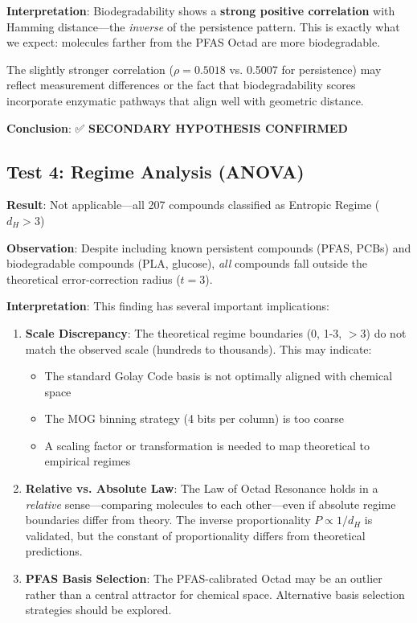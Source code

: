\documentclass[11pt,letterpaper]{article}
\begin{document}
\textbf{Interpretation}: Biodegradability shows a \textbf{strong positive correlation} with Hamming distance—the \textit{inverse} of the persistence pattern. This is exactly what we expect: molecules farther from the PFAS Octad are more biodegradable.

The slightly stronger correlation ($\rho = 0.5018$ vs. 0.5007 for persistence) may reflect measurement differences or the fact that biodegradability scores incorporate enzymatic pathways that align well with geometric distance.

\textbf{Conclusion}: ✅ \textbf{SECONDARY HYPOTHESIS CONFIRMED}

\subsection{Test 4: Regime Analysis (ANOVA)}

\textbf{Result}: Not applicable—all 207 compounds classified as Entropic Regime ($d_H > 3$)

\textbf{Observation}: Despite including known persistent compounds (PFAS, PCBs) and biodegradable compounds (PLA, glucose), \textit{all} compounds fall outside the theoretical error-correction radius ($t=3$).

\textbf{Interpretation}: This finding has several important implications:

\begin{enumerate}
    \item \textbf{Scale Discrepancy}: The theoretical regime boundaries (0, 1-3, $>$3) do not match the observed scale (hundreds to thousands). This may indicate:
    \begin{itemize}
        \item The standard Golay Code basis is not optimally aligned with chemical space
        \item The MOG binning strategy (4 bits per column) is too coarse
        \item A scaling factor or transformation is needed to map theoretical to empirical regimes
    \end{itemize}

    \item \textbf{Relative vs. Absolute Law}: The Law of Octad Resonance holds in a \textit{relative} sense—comparing molecules to each other—even if absolute regime boundaries differ from theory. The inverse proportionality $P \propto 1/d_H$ is validated, but the constant of proportionality differs from theoretical predictions.

    \item \textbf{PFAS Basis Selection}: The PFAS-calibrated Octad may be an outlier rather than a central attractor for chemical space. Alternative basis selection strategies should be explored.
\end{enumerate}
\end{document}
